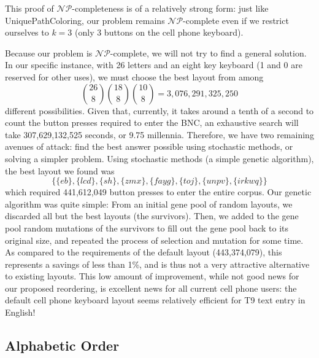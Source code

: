 \documentclass[runningheads]{llncs}
\newcommand{\NP}{\ensuremath{\mathcal{NP}}}
\begin{document}
This proof of \NP-completeness is of a relatively strong form: just like {\sc UniquePathColoring}, our problem remains \NP-complete even if we restrict ourselves to $k=3$ (only 3 buttons on the cell phone keyboard).

Because our problem is \NP-complete, we will not try to find a general solution.  In our specific instance, with 26 letters and an eight key keyboard (1 and 0 are reserved for other uses),  we must choose the best layout from among $$\binom{26}{8} \binom{18}{8} \binom{10}{8} = 3,076,291,325,250$$ different possibilities.  Given that, currently, it takes around a tenth of a second to count the button presses required to enter the BNC, an exhaustive search will take 307,629,132,525 seconds, or 9.75 millennia.  Therefore, we have two remaining avenues of attack: find the best answer possible using stochastic methods, or solving a simpler problem.  Using stochastic methods (a simple genetic algorithm), the best layout we found was 
$$\{\{eb\}, \{lcd\}, \{sh\}, \{zmx\}, \{fayg\}, \{toj\}, \{unpv\}, \{irkwq\}\}$$
which required 441,612,049 button presses to enter the entire corpus.  Our genetic algorithm was quite simple: From an initial gene pool of random layouts, we discarded all but the best layouts (the survivors).  Then, we added to the gene pool random mutations of the survivors to fill out the gene pool back to its original size, and repeated the process of selection and mutation for some time.  As compared to the requirements of the default layout (443,374,079), this represents a savings of less than 1\%, and is thus not a very attractive alternative to existing layouts.  This low amount of improvement, while not good news for our proposed reordering, is excellent news for all current cell phone users: the default cell phone keyboard layout seems relatively efficient for T9 text entry in English!

\subsection{Alphabetic Order}
\end{document}
